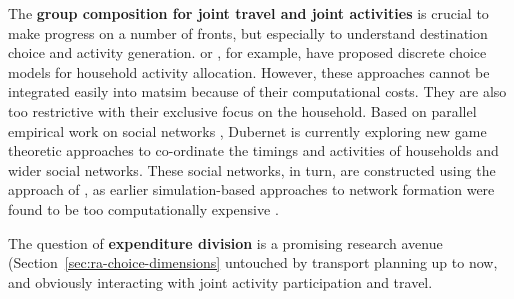 The \textbf{group composition for joint travel and joint activities} is crucial to make progress on a number of fronts, but especially to understand destination choice and activity generation. 
\citet{GliebeKoppelman_Transportation_2005} or
\citet{ZhangEtAl_TransResB_2005},
for example, have proposed discrete choice models for household activity allocation. However, these approaches cannot be integrated easily into \gls{matsim} because of their computational costs. They are also too restrictive with their exclusive focus on the household.  Based on parallel empirical work on social networks 
\citep[see][]{LarsenEtAl_MOB_2006,KowaldEtAl_JTG_2013},
Dubernet is currently exploring new game theoretic approaches to co-ordinate the timings and activities of households and wider social networks.  These social networks, in turn, are constructed using the approach of 
\citet{ArentzeEtAl_SN_2013},
as earlier simulation-based approaches to network formation were found to be too computationally expensive \citep[e.g.,][]{Hackney_PhDThesis_2009}.

The question of \textbf{expenditure division} is a promising research avenue (Section~\ref{sec:ra-choice-dimensions} untouched by transport planning up to now, and obviously interacting with joint activity participation and travel. 

